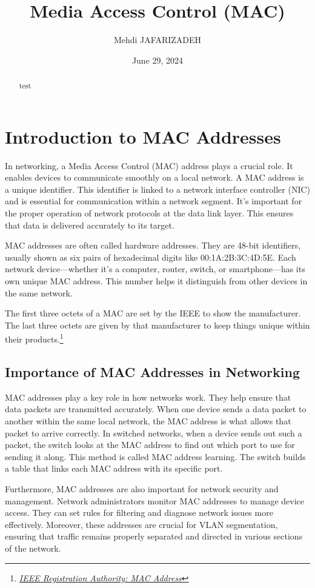 \documentclass[11pt,a4paper]{article}
\title{Media Access Control (MAC)}
\author{Mehdi JAFARIZADEH}
\date{June 29, 2024}
\begin{document}
\maketitle

\begin{abstract}
    test
\end{abstract}


\section*{Introduction to MAC Addresses}
In networking, a Media Access Control (MAC) address plays a crucial role. It enables devices to communicate smoothly on a local network. A MAC address is a unique identifier. This identifier is linked to a network interface controller (NIC) and is essential for communication within a network segment. It’s important for the proper operation of network protocols at the data link layer. This ensures that data is delivered accurately to its target.

MAC addresses are often called hardware addresses. They are 48-bit identifiers, usually shown as six pairs of hexadecimal digits like 00:1A:2B:3C:4D:5E. Each network device—whether it's a computer, router, switch, or smartphone—has its own unique MAC address. This number helps it distinguish from other devices in the same network.

The first three octets of a MAC are set by the IEEE to show the manufacturer. The last three octets are given by that manufacturer to keep things unique within their products.\footnote{\href{https://standards.ieee.org/products-programs/regauth/}{\textit{IEEE Registration Authority: MAC Address}}}


\subsection*{Importance of MAC Addresses in Networking}

MAC addresses play a key role in how networks work. They help ensure that data packets are transmitted accurately. When one device sends a data packet to another within the same local network, the MAC address is what allows that packet to arrive correctly. In switched networks, when a device sends out such a packet, the switch looks at the MAC address to find out which port to use for sending it along. This method is called MAC address learning. The switch builds a table that links each MAC address with its specific port.

Furthermore, MAC addresses are also important for network security and management. Network administrators monitor MAC addresses to manage device access. They can set rules for filtering and diagnose network issues more effectively. Moreover, these addresses are crucial for VLAN segmentation, ensuring that traffic remains properly separated and directed in various sections of the network.
\end{document}
